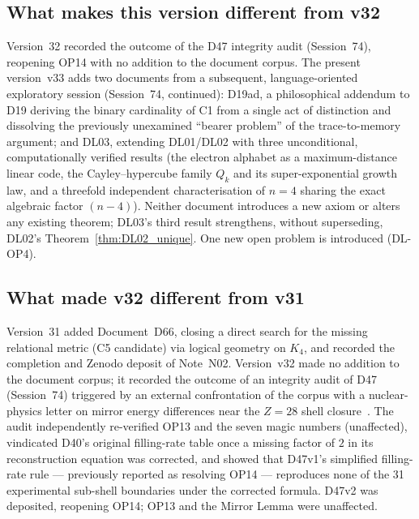 \documentclass[11pt,a4paper]{article}
\theoremstyle{plain}
\theoremstyle{definition}
\theoremstyle{remark}
\begin{document}
\subsection{What makes this version different from v32}
\label{subsec:diffv32}
Version~32 recorded the outcome of the D47 integrity audit (Session~74), reopening OP14 with no addition to the document corpus. The present version~v33 adds two documents from a subsequent, language-oriented exploratory session (Session~74, continued): D19ad, a philosophical addendum to D19 deriving the binary cardinality of C1 from a single act of distinction and dissolving the previously unexamined ``bearer problem'' of the trace-to-memory argument; and DL03, extending DL01/DL02 with three unconditional, computationally verified results (the electron alphabet as a maximum-distance linear code, the Cayley--hypercube family $Q_k$ and its super-exponential growth law, and a threefold independent characterisation of $n=4$ sharing the exact algebraic factor $(n-4)$). Neither document introduces a new axiom or alters any existing theorem; DL03's third result strengthens, without superseding, DL02's Theorem~\ref{thm:DL02_unique}. One new open problem is introduced (DL-OP4).

\subsection{What made v32 different from v31}
\label{subsec:diffv31}
Version~31 added Document~D66, closing a direct search for the missing relational metric (C5 candidate) via logical geometry on $K_4$, and recorded the completion and Zenodo deposit of Note~N02. Version~v32 made no addition to the document corpus; it recorded the outcome of an integrity audit of D47 (Session~74) triggered by an external confrontation of the corpus with a nuclear-physics letter on mirror energy differences near the $Z=28$ shell closure~\cite{Pigliapoco2026}. The audit independently re-verified OP13 and the seven magic numbers (unaffected), vindicated D40's original filling-rate table once a missing factor of $2$ in its reconstruction equation was corrected, and showed that D47v1's simplified filling-rate rule --- previously reported as resolving OP14 --- reproduces none of the 31 experimental sub-shell boundaries under the corrected formula. D47v2 was deposited, reopening OP14; OP13 and the Mirror Lemma were unaffected.
\end{document}
